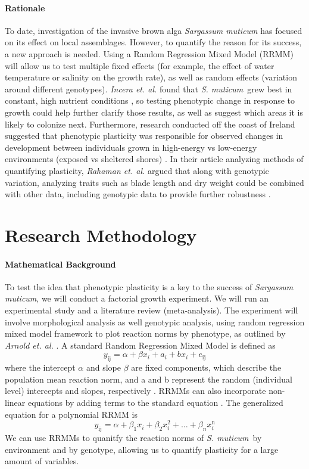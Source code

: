 \documentclass[12pt]{extarticle}
\newcommand\x{\textit{S. muticum}}
\begin{document}
\paragraph{Rationale}
To date, investigation of the invasive brown alga \textit{Sargassum muticum} has focused on its effect on local assemblages. However, to quantify the reason for its success, a new approach is needed. Using a Random Regression Mixed Model (RRMM) will allow us to test multiple fixed effects (for example, the effect of water temperature or salinity on the growth rate), as well as random effects (variation around different genotypes). \textit{Incera et. al.} found that \x\  grew best in constant, high nutrient conditions \cite{Incera2009}, so testing phenotypic change in response to growth could help further clarify those results, as well as suggest which areas it is likely to colonize next. Furthermore, research conducted off the coast of Ireland suggested that phenotypic plasticity was responsible for observed changes in development between individuals grown in high-energy vs low-energy environments (exposed vs sheltered shores) \cite{Baer2010}. In their article analyzing methods of quantifying plasticity, \textit{Rahaman et. al.} argued that along with genotypic variation, analyzing traits such as blade length and dry weight could be combined with other data, including genotypic data to provide further robustness \cite{10.3389/fpls.2015.00619}.

\section{Research Methodology}
\paragraph{Mathematical Background}
To test the idea that phenotypic plasticity is a key to the success of \textit{Sargassum muticum}, we will conduct a factorial growth experiment. We will run an experimental study and a literature review (meta-analysis). The experiment will involve morphological analysis as well genotypic analysis, using random regression mixed model framework to plot reaction norms by phenotype, as outlined by \textit{Arnold et. al.} \cite{Arnold2019}. A standard Random Regression Mixed Model is defined as
\[y_\text{ij} = \alpha + \beta x_i + a_i + bx_i + e_\text{ij}\]
where the intercept \(\alpha\) and slope \(\beta\) are fixed components, which describe the population mean reaction norm, and a and b represent the random (individual level) intercepts and slopes, respectively \cite{Arnold2019}. RRMMs can also incorporate non-linear equations by adding terms to the standard equation \cite{Arnold2019}. The generalized equation for a polynomial RRMM is
\[y_\text{ij} = \alpha + \beta_1 x_i + \beta_2 x_i^2 + \dots + \beta_n x_i^\text{n}\]
We can use RRMMs to quanitfy the reaction norms of \x\ by environment and by genotype, allowing us to quantify plasticity for a large amount of variables.
\end{document}
